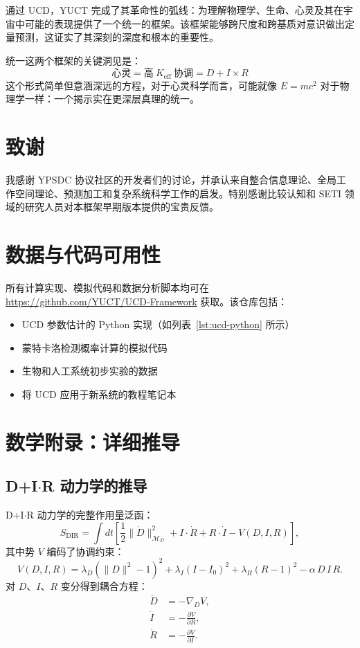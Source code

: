 \documentclass[11pt,a4paper]{article}
\newcommand{\eff}{\mathrm{eff}}
\newcommand{\Dict}{\mathcal{D}}
\newcommand{\Mdict}{\mathcal{M}_{\Dict}}
\newcommand{\Ke}{K_{\eff}}
\begin{document}
	通过 UCD，YUCT 完成了其革命性的弧线：为理解物理学、生命、心灵及其在宇宙中可能的表现提供了一个统一的框架。该框架能够跨尺度和跨基质对意识做出定量预测，这证实了其深刻的深度和根本的重要性。
	
	统一这两个框架的关键洞见是：
	\[
	\boxed{\text{心灵} = \text{高}\ \Ke\ \text{协调} = D + I \times R}
	\]
	这个形式简单但意涵深远的方程，对于心灵科学而言，可能就像 \(E = mc^2\) 对于物理学一样：一个揭示实在更深层真理的统一。
	
	\section*{致谢}
	
	我感谢 YPSDC 协议社区的开发者们的讨论，并承认来自整合信息理论、全局工作空间理论、预测加工和复杂系统科学工作的启发。特别感谢比较认知和 SETI 领域的研究人员对本框架早期版本提供的宝贵反馈。
	
	\section*{数据与代码可用性}
	
	所有计算实现、模拟代码和数据分析脚本均可在 \url{https://github.com/YUCT/UCD-Framework} 获取。该仓库包括：
	\begin{itemize}
		\item UCD 参数估计的 Python 实现（如列表~\ref{lst:ucd-python} 所示）
		\item 蒙特卡洛检测概率计算的模拟代码
		\item 生物和人工系统初步实验的数据
		\item 将 UCD 应用于新系统的教程笔记本
	\end{itemize}
	
	\appendix
	
	\section{数学附录：详细推导}
	
	\subsection{D+I\(\cdot\)R 动力学的推导}
	
	D+I\(\cdot\)R 动力学的完整作用量泛函：
	\[
	S_{\mathrm{DIR}} = \int dt \left[ \frac{1}{2}\|\dot{D}\|^2_{\Mdict} + I \cdot \dot{R} + R \cdot \dot{I} - V(D,I,R) \right],
	\]
	其中势 \(V\) 编码了协调约束：
	\[
	V(D,I,R) = \lambda_D (\|D\|^2 - 1)^2 + \lambda_I (I - I_0)^2 + \lambda_R (R - 1)^2 - \alpha\, D\,I\,R.
	\]
	对 \(D\)、\(I\)、\(R\) 变分得到耦合方程：
	\begin{align*}
		\ddot{D} &= -\nabla_D V, \\
		\dot{I}  &= -\frac{\partial V}{\partial R}, \\
		\dot{R}  &= -\frac{\partial V}{\partial I}.
	\end{align*}
	
\end{document}
